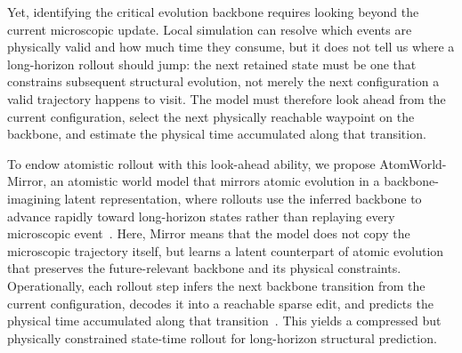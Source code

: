 \documentclass{article}
\begin{document}
Yet, identifying the critical evolution backbone requires looking beyond the current microscopic update. Local simulation can resolve which events are physically valid and how much time they consume, but it does not tell us where a long-horizon rollout should jump: the next retained state must be one that constrains subsequent structural evolution, not merely the next configuration a valid trajectory happens to visit. The model must therefore look ahead from the current configuration, select the next physically reachable waypoint on the backbone, and estimate the physical time accumulated along that transition.

To endow atomistic rollout with this look-ahead ability, we propose AtomWorld-Mirror, an atomistic world model that mirrors atomic evolution in a backbone-imagining latent representation, where rollouts use the inferred backbone to advance rapidly toward long-horizon states rather than replaying every microscopic event~\cite{kingma2014vae,hafner2019planet,hafner2020dreamer,hafner2025dreamer4}. Here, Mirror means that the model does not copy the microscopic trajectory itself, but learns a latent counterpart of atomic evolution that preserves the future-relevant backbone and its physical constraints. Operationally, each rollout step infers the next backbone transition from the current configuration, decodes it into a reachable sparse edit, and predicts the physical time accumulated along that transition~\cite{fichthorn1991dmc,chatterjee2007kmc}. This yields a compressed but physically constrained state-time rollout for long-horizon structural prediction.
\end{document}
